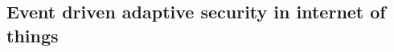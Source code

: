 \documentclass[tid,table]{texufpel} %
\begin{document}


\subsection{Event driven adaptive security in internet of things} %

\end{document}
